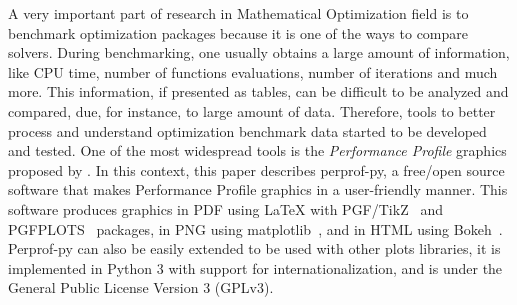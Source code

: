 A very important part of research in Mathematical Optimization field is to benchmark
optimization packages because it is one of the ways to compare
solvers.
During benchmarking, one usually
obtains a large amount of information, like CPU time, number of functions
evaluations, number of iterations and much more. This information, if
presented as tables, can be difficult to be analyzed and compared, due, for instance, to
large amount of data.  Therefore, 
tools to better process and understand optimization benchmark data  started to be developed and tested. One of
the most widespread tools  is the \emph{Performance Profile} graphics proposed by
\textcite{Dolan:2002du}. In this context, this paper describes  perprof-py, a free/open source software
that makes Performance Profile graphics in a user-friendly manner. This software produces graphics in PDF using LaTeX with
PGF/TikZ~\cite{TikZ} and PGFPLOTS~\cite{pgfplots} packages, in
PNG using matplotlib~\cite{Hunter:2007}, and in HTML using
Bokeh~\cite{url:bokeh}. Perprof-py  can also be easily
extended to be used with other plots libraries,  it is implemented
in Python 3 with support for internationalization, and is under the General
Public License Version 3 (GPLv3).
